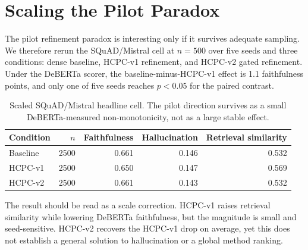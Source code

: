 \section{Scaling the Pilot Paradox}
\label{sec:scaling}

The pilot refinement paradox is interesting only if it survives adequate
sampling. We therefore rerun the SQuAD/Mistral cell at \(n=500\) over five
seeds and three conditions: dense baseline, HCPC-v1 refinement, and HCPC-v2
gated refinement. Under the DeBERTa scorer, the baseline-minus-HCPC-v1 effect
is 1.1 faithfulness points, and only one of five seeds reaches \(p<0.05\) for
the paired contrast.

\begin{table}[H]
\centering
\small
\caption{Scaled SQuAD/Mistral headline cell. The pilot direction survives as a
small DeBERTa-measured non-monotonicity, not as a large stable effect.}
\label{tab:scaled}
\begin{tabular}{lrrrr}
\toprule
Condition & \(n\) & Faithfulness & Hallucination & Retrieval similarity \\
\midrule
Baseline & 2500 & 0.661 & 0.146 & 0.532 \\
HCPC-v1 & 2500 & 0.650 & 0.147 & 0.569 \\
HCPC-v2 & 2500 & 0.661 & 0.143 & 0.532 \\
\bottomrule
\end{tabular}
\end{table}

The result should be read as a scale correction. HCPC-v1 raises retrieval
similarity while lowering DeBERTa faithfulness, but the magnitude is small and
seed-sensitive. HCPC-v2 recovers the HCPC-v1 drop on average, yet this does
not establish a general solution to hallucination or a global method ranking.
